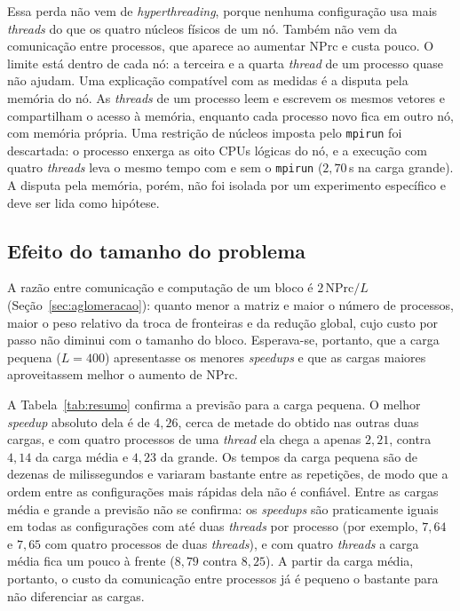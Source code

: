 \documentclass[11pt,a4paper]{article}
\begin{document}
Essa perda não vem de \emph{hyperthreading}, porque nenhuma configuração usa mais \emph{threads} do que os quatro núcleos físicos de um nó. Também não vem da comunicação entre processos, que aparece ao aumentar NPrc e custa pouco. O limite está dentro de cada nó: a terceira e a quarta \emph{thread} de um processo quase não ajudam. Uma explicação compatível com as medidas é a disputa pela memória do nó. As \emph{threads} de um processo leem e escrevem os mesmos vetores e compartilham o acesso à memória, enquanto cada processo novo fica em outro nó, com memória própria. Uma restrição de núcleos imposta pelo \texttt{mpirun} foi descartada: o processo enxerga as oito CPUs lógicas do nó, e a execução com quatro \emph{threads} leva o mesmo tempo com e sem o \texttt{mpirun} ($2{,}70$\,s na carga grande). A disputa pela memória, porém, não foi isolada por um experimento específico e deve ser lida como hipótese.

\subsection{Efeito do tamanho do problema}

A razão entre comunicação e computação de um bloco é $2\,\text{NPrc}/L$ (Seção~\ref{sec:aglomeracao}): quanto menor a matriz e maior o número de processos, maior o peso relativo da troca de fronteiras e da redução global, cujo custo por passo não diminui com o tamanho do bloco. Esperava-se, portanto, que a carga pequena ($L=400$) apresentasse os menores \emph{speedups} e que as cargas maiores aproveitassem melhor o aumento de NPrc.

A Tabela~\ref{tab:resumo} confirma a previsão para a carga pequena. O melhor \emph{speedup} absoluto dela é de $4{,}26$, cerca de metade do obtido nas outras duas cargas, e com quatro processos de uma \emph{thread} ela chega a apenas $2{,}21$, contra $4{,}14$ da carga média e $4{,}23$ da grande. Os tempos da carga pequena são de dezenas de milissegundos e variaram bastante entre as repetições, de modo que a ordem entre as configurações mais rápidas dela não é confiável. Entre as cargas média e grande a previsão não se confirma: os \emph{speedups} são praticamente iguais em todas as configurações com até duas \emph{threads} por processo (por exemplo, $7{,}64$ e $7{,}65$ com quatro processos de duas \emph{threads}), e com quatro \emph{threads} a carga média fica um pouco à frente ($8{,}79$ contra $8{,}25$). A partir da carga média, portanto, o custo da comunicação entre processos já é pequeno o bastante para não diferenciar as cargas.
\end{document}
